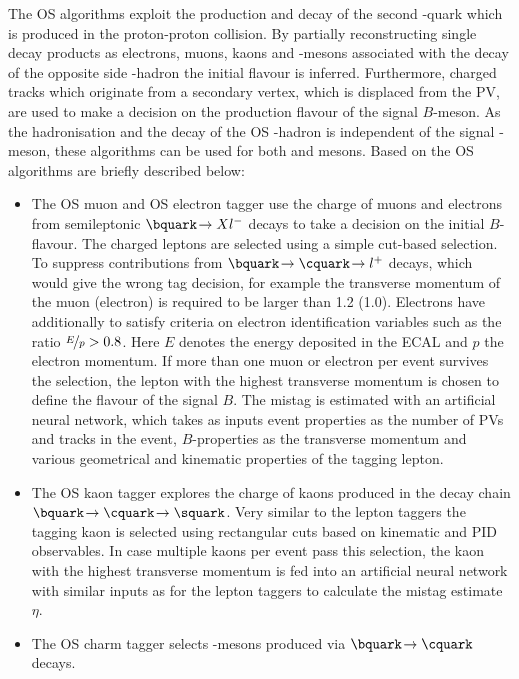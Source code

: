 The OS algorithms exploit the production and decay of the second \bquark-quark which is produced in the proton-proton collision.
By partially reconstructing single decay products as electrons, muons, kaons and \D-mesons associated with the decay of the opposite side \bquark-hadron the initial flavour is inferred.
Furthermore, charged tracks which originate from a secondary vertex, which is displaced from the \ac{PV}, are used to make a decision on the production flavour of the signal $B$-meson.
As the hadronisation and the decay of the OS \bquark-hadron is independent of the signal \B-meson, these algorithms can be used for both \Bz and \Bs mesons. Based on \cite{LHCb-PAPER-2011-027, LHCb-PAPER-2015-027} the OS algorithms are briefly described below:
\begin{itemize}
    \item The OS muon and OS electron tagger use the charge of muons and electrons from semileptonic $\bquark\!\to Xl^-$ decays to take a decision on the initial $B$-flavour.
    The charged leptons are selected using a simple cut-based selection.
    To suppress contributions from $\bquark\!\to\cquark\!\to l^+$ decays, which would give the wrong tag decision, for example the transverse momentum of the muon (electron) is required to be larger than \SI[per-mode=symbol]{1.2}{\GeVc} (\SI[per-mode=symbol]{1.0}{\GeVc}).
    Electrons have additionally to satisfy criteria on electron identification variables such as the ratio $\nicefrac{E}{p}>0.8$.
    Here $E$ denotes the energy deposited in the ECAL and $p$ the electron momentum.
    If more than one muon or electron per event survives the selection, the lepton with the highest transverse momentum is chosen to define the flavour of the signal $B$.
    The mistag is estimated with an artificial neural network, which takes as inputs event properties as the number of \ac{PV}s and tracks in the event, $B$-properties as the transverse momentum and various geometrical and kinematic properties of the tagging lepton.
    \item The OS kaon tagger explores the charge of kaons produced in the decay chain $\bquark\!\to\cquark\!\to\squark$.
    Very similar to the lepton taggers the tagging kaon is selected using rectangular cuts based on kinematic and PID observables.
    In case multiple kaons per event pass this selection, the kaon with the highest transverse momentum is fed into an artificial neural network with similar inputs as for the lepton taggers to calculate the mistag estimate $\eta$.
    \item The OS charm tagger selects \D-mesons produced via $\bquark\!\to\cquark$ decays.

\end{itemize}
